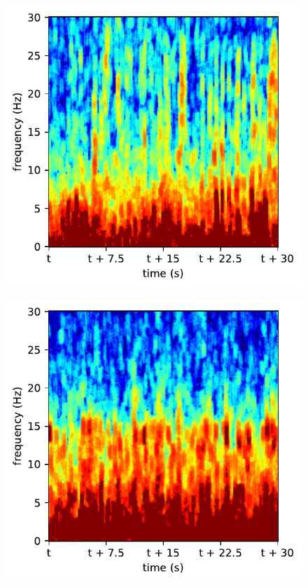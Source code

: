 \begin{subfigure}{.16\textwidth}
  \centering
  \includegraphics[width=1\linewidth]{./pics/class_clean_2}
  \caption{}
  \label{fig_1_13}
\end{subfigure}%
\begin{subfigure}{.16\textwidth}
  \centering
  \includegraphics[width=1\linewidth]{./pics/class_clean_3}
  \caption{}
  \label{fig_1_14}
\end{subfigure}%

